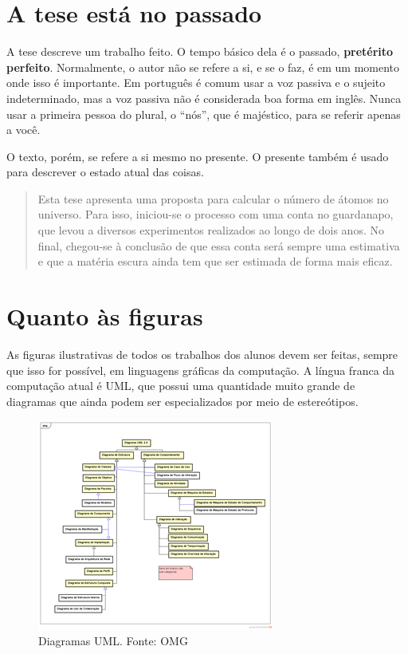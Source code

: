 \section{A tese está no passado}

A tese descreve um trabalho feito. O tempo básico dela é o passado,\textbf{ pretérito perfeito}. Normalmente, o autor não se refere a si, e se o faz, é em um momento onde isso é importante. Em português é comum usar a voz passiva e o sujeito indeterminado, mas a voz passiva não é considerada boa forma em inglês. Nunca usar a primeira pessoa do plural, o ``nós'', que é majéstico, para se referir apenas a você.

O texto, porém, se refere a si mesmo no presente. O presente também é usado para descrever o estado atual das coisas. 

\begin{quote}
Esta tese apresenta uma proposta para calcular o número de átomos no universo. Para isso, iniciou-se o processo com uma conta no guardanapo, que levou a diversos experimentos realizados ao longo de dois anos. No final, chegou-se à conclusão de que essa conta será sempre uma estimativa e que a matéria escura ainda tem que ser estimada de forma mais eficaz.
\end{quote}


\section{Quanto às figuras}

As figuras ilustrativas de todos os trabalhos dos alunos devem ser feitas, sempre que isso for possível, em linguagens gráficas da computação. A língua franca da computação atual é UML, que possui uma quantidade muito grande de diagramas que ainda podem ser especializados por meio de estereótipos.

\begin{figure}[hbt]
    \centering
    \includegraphics[width=0.7\linewidth]{Images/diagramasuml}
    \caption{Diagramas UML. Fonte: OMG}
    \label{fig:diagramasuml}
\end{figure}


